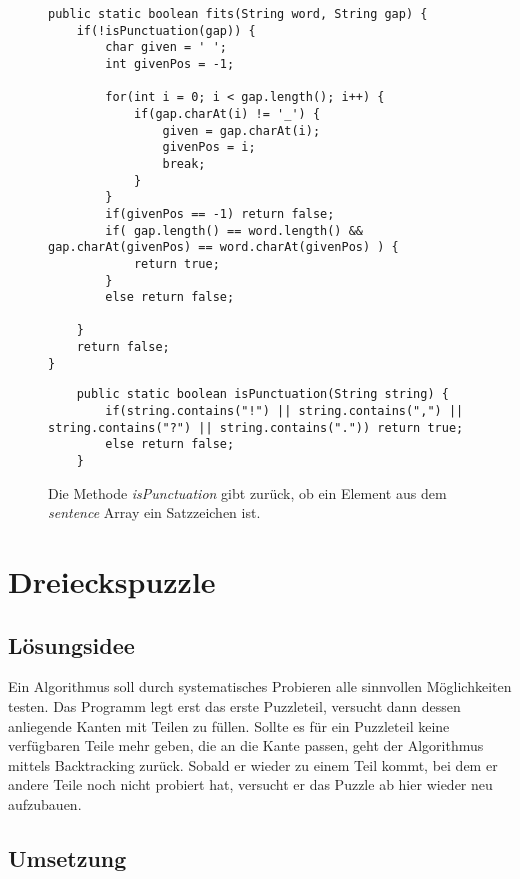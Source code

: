 \documentclass[a4paper, 12pt]{scrartcl}
\begin{document}
\begin{figure}[H]
    \centering
\begin{lstlisting}
public static boolean fits(String word, String gap) {
    if(!isPunctuation(gap)) {
        char given = ' ';
        int givenPos = -1;
        
        for(int i = 0; i < gap.length(); i++) {
            if(gap.charAt(i) != '_') {
                given = gap.charAt(i);
                givenPos = i;
                break;
            }
        }
        if(givenPos == -1) return false;
        if( gap.length() == word.length() && gap.charAt(givenPos) == word.charAt(givenPos) ) {
            return true;
        }
        else return false;
        
    }
    return false;
}
\end{lstlisting}
\end{figure}

\begin{figure}[H]
    \centering
\begin{lstlisting}
    public static boolean isPunctuation(String string) {
    	if(string.contains("!") || string.contains(",") || string.contains("?") || string.contains(".")) return true;
    	else return false;
    }
\end{lstlisting}
\caption{Die Methode \emph{isPunctuation} gibt zurück, ob ein Element aus dem \emph{sentence} Array ein Satzzeichen ist.}
\end{figure}

\section{Dreieckspuzzle}
\subsection{Lösungsidee}

Ein Algorithmus soll durch systematisches Probieren alle sinnvollen Möglichkeiten testen. Das Programm legt erst das erste Puzzleteil, versucht dann dessen anliegende Kanten mit Teilen zu füllen. Sollte es für ein Puzzleteil keine verfügbaren Teile mehr geben, die an die Kante passen, geht der Algorithmus mittels Backtracking zurück. Sobald er wieder zu einem Teil kommt, bei dem er andere Teile noch nicht probiert hat, versucht er das Puzzle ab hier wieder neu aufzubauen.

\subsection{Umsetzung}
\end{document}
